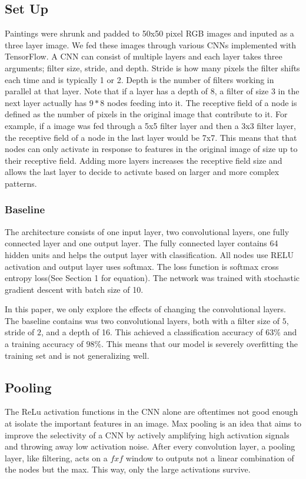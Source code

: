 \documentclass[10pt,twoside]{article}
\begin{document}
\subsection{Set Up}

\noindent Paintings were shrunk and padded to 50x50 pixel RGB images and inputed as a three layer image. We fed these images through various CNNs implemented with TensorFlow. A CNN can consist of multiple layers and each layer takes three arguments; filter size, stride, and depth. Stride is how many pixels the filter shifts each time and is typically 1 or 2. Depth is the number of filters working in parallel at that layer. Note that if a layer has a depth of 8, a filter of size 3 in the next layer actually has $9*8$ nodes feeding into it. The receptive field of a node is defined as the number of pixels in the original image that contribute to it. For example, if a image was fed through a 5x5 filter layer and then a 3x3 filter layer, the receptive field of a node in the last layer would be 7x7. This means that that nodes can only activate in response to features in the original image of size up to their receptive field. Adding more layers increases the receptive field size and allows the last layer to decide to activate based on larger and more complex patterns.

\subsubsection{Baseline}
 The architecture consists of one input layer, two convolutional layers, one fully connected layer and one output layer. The fully connected layer contains 64 hidden units and helps the output layer with classification. All nodes use RELU activation and output layer uses softmax. The loss function is softmax cross entropy loss(See Section 1 for equation). The network was trained with stochastic gradient descent with batch size of 10.

 In this paper, we only explore the effects of changing the convolutional layers. The baseline contains was two convolutional layers, both with a filter size of $5$, stride of $2$, and a depth of 16. This achieved a classification accuracy of $63\%$ and a training accuracy of $98\%$. This means that our model is severely overfitting the training set and is not generalizing well.

\subsection{Pooling}
The ReLu activation functions in the CNN alone are oftentimes not good enough at isolate the important features in an image. Max pooling is an idea that aims to improve the selectivity of a CNN by actively amplifying high activation signals and throwing away low activation noise. After every convolution layer, a pooling layer, like filtering, acts on a $fxf$ window to outputs not a linear combination of the nodes but the max. This way, only the large activations survive. 
\end{document}
